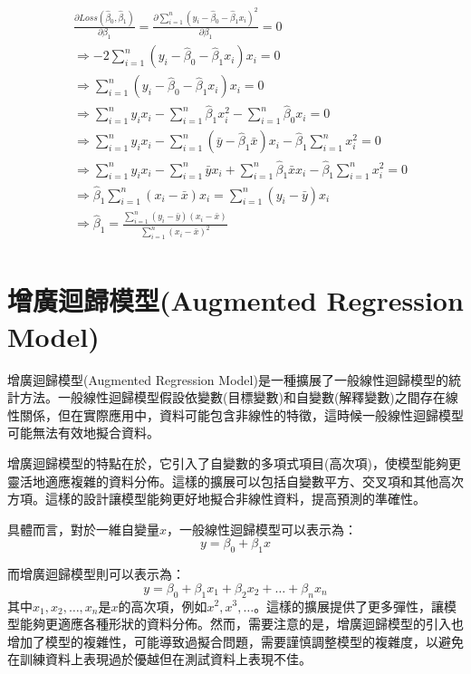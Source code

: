 \documentclass[12pt, a4paper]{article}
\begin{document}
\begin{align*}
&\frac{\partial Loss\left(\hat{\beta}_0,\hat{\beta}_1\right)}{\partial \beta_1}=\frac{\partial \sum_{i=1}^n\left(y_i-\hat{\beta}_0-\hat{\beta}_1x_i\right)^2}{\partial \beta_1}=0\\
&\Rightarrow -2\sum_{i=1}^n\left(y_i-\hat{\beta}_0-\hat{\beta}_1x_i\right)x_i=0\\
&\Rightarrow \sum_{i=1}^n\left(y_i-\hat{\beta}_0-\hat{\beta}_1x_i\right)x_i=0\\
&\Rightarrow \sum_{i=1}^ny_ix_i-\sum_{i=1}^n\hat{\beta}_1x_i^2-\sum_{i=1}^n\hat{\beta}_0x_i=0\\
&\Rightarrow \sum_{i=1}^ny_ix_i-\sum_{i=1}^n\left(\bar{y}-\hat{\beta}_1\bar{x}\right)x_i-\hat{\beta}_1\sum_{i=1}^nx_i^2=0\\
&\Rightarrow \sum_{i=1}^ny_ix_i-\sum_{i=1}^n\bar{y}x_i+\sum_{i=1}^n\hat{\beta}_1\bar{x}x_i-\hat{\beta}_1\sum_{i=1}^nx_i^2=0\\
&\Rightarrow \hat{\beta}_1\sum_{i=1}^n\left(x_i-\bar{x}\right)x_i=\sum_{i=1}^n\left(y_i-\bar{y}\right)x_i\\
&\Rightarrow \hat{\beta}_1=\frac{\sum_{i=1}^n\left(y_i-\bar{y}\right)\left(x_i-\bar{x}\right)}{\sum_{i=1}^n\left(x_i-\bar{x}\right)^2}\\
\end{align*}
\section{增廣迴歸模型(Augmented Regression Model)}
增廣迴歸模型(Augmented Regression Model)是一種擴展了一般線性迴歸模型的統計方法。一般線性迴歸模型假設依變數(目標變數)和自變數(解釋變數)之間存在線性關係，但在實際應用中，資料可能包含非線性的特徵，這時候一般線性迴歸模型可能無法有效地擬合資料。

增廣迴歸模型的特點在於，它引入了自變數的多項式項目(高次項)，使模型能夠更靈活地適應複雜的資料分佈。這樣的擴展可以包括自變數平方、交叉項和其他高次方項。這樣的設計讓模型能夠更好地擬合非線性資料，提高預測的準確性。

具體而言，對於一維自變量$x$，一般線性迴歸模型可以表示為：$$y=\beta_0+\beta_1x$$

而增廣迴歸模型則可以表示為：$$y=\beta_0+\beta_1x_1+\beta_2x_2+\dots+\beta_nx_n$$
其中$x_1,x_2,\dots,x_n$是$x$的高次項，例如$x^2,x^3,\dots$。這樣的擴展提供了更多彈性，讓模型能夠更適應各種形狀的資料分佈。然而，需要注意的是，增廣迴歸模型的引入也增加了模型的複雜性，可能導致過擬合問題，需要謹慎調整模型的複雜度，以避免在訓練資料上表現過於優越但在測試資料上表現不佳。
\end{document}
